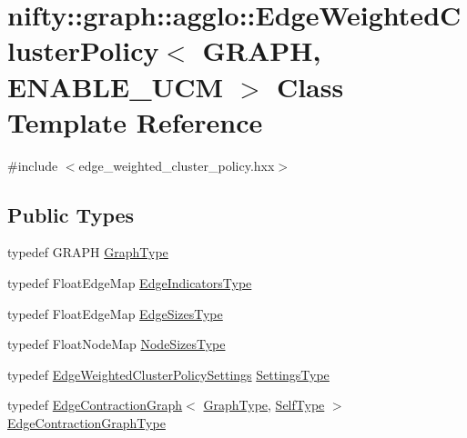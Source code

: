 \hypertarget{classnifty_1_1graph_1_1agglo_1_1EdgeWeightedClusterPolicy}{}\section{nifty\+:\+:graph\+:\+:agglo\+:\+:Edge\+Weighted\+Cluster\+Policy$<$ G\+R\+A\+P\+H, E\+N\+A\+B\+L\+E\+\_\+\+U\+C\+M $>$ Class Template Reference}
\label{classnifty_1_1graph_1_1agglo_1_1EdgeWeightedClusterPolicy}


{\ttfamily \#include $<$edge\+\_\+weighted\+\_\+cluster\+\_\+policy.\+hxx$>$}

\subsection*{Public Types}
\begin{DoxyCompactItemize}
\item 
typedef G\+R\+A\+P\+H \hyperlink{classnifty_1_1graph_1_1agglo_1_1EdgeWeightedClusterPolicy_a8e910f7b9d0c1baa1de7b6b1c3e58397}{Graph\+Type}
\item 
typedef Float\+Edge\+Map \hyperlink{classnifty_1_1graph_1_1agglo_1_1EdgeWeightedClusterPolicy_a1b8107133a86be855885f1910652b0af}{Edge\+Indicators\+Type}
\item 
typedef Float\+Edge\+Map \hyperlink{classnifty_1_1graph_1_1agglo_1_1EdgeWeightedClusterPolicy_a64d646cc14e503e9a76a4646234d9754}{Edge\+Sizes\+Type}
\item 
typedef Float\+Node\+Map \hyperlink{classnifty_1_1graph_1_1agglo_1_1EdgeWeightedClusterPolicy_a44ba54059efcb57c8c8091016fb9ee99}{Node\+Sizes\+Type}
\item 
typedef \hyperlink{structnifty_1_1graph_1_1agglo_1_1EdgeWeightedClusterPolicySettings}{Edge\+Weighted\+Cluster\+Policy\+Settings} \hyperlink{classnifty_1_1graph_1_1agglo_1_1EdgeWeightedClusterPolicy_a6c9e2acec086a9fcc4391f067a4ded46}{Settings\+Type}
\item 
typedef \hyperlink{classnifty_1_1graph_1_1EdgeContractionGraph}{Edge\+Contraction\+Graph}$<$ \hyperlink{classnifty_1_1graph_1_1agglo_1_1EdgeWeightedClusterPolicy_a8e910f7b9d0c1baa1de7b6b1c3e58397}{Graph\+Type}, \hyperlink{classnifty_1_1graph_1_1agglo_1_1EdgeWeightedClusterPolicy}{Self\+Type} $>$ \hyperlink{classnifty_1_1graph_1_1agglo_1_1EdgeWeightedClusterPolicy_af2c3024ed1be514c58004dfa7e77448b}{Edge\+Contraction\+Graph\+Type}
\end{DoxyCompactItemize}
